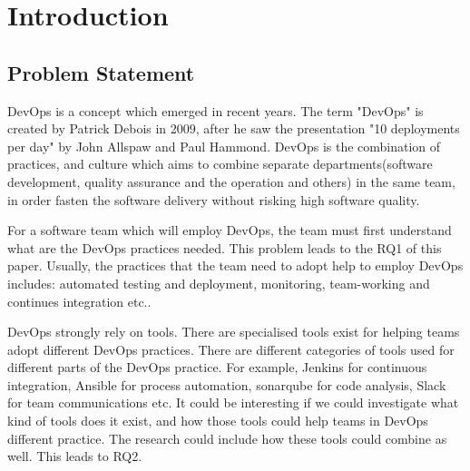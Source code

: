 \chapter{Introduction}
\label{chp:introduction}
\section{Problem Statement}
DevOps is a concept which emerged in recent years. The term "DevOps" is created by Patrick Debois in 2009, after he saw the presentation "10 deployments per day" by John Allspaw and Paul Hammond.\cite{kim2016devops} DevOps is the combination of practices, and culture which aims to combine separate departments(software development, quality assurance and the operation and others) in the same team, in order fasten the software delivery without risking high software quality.\cite{DevOpsWi87:online}\cite{ebert2016devops}
\par
For a software team which will employ DevOps, the team must first understand what are the DevOps practices needed. This problem leads to the RQ1 of this paper.
Usually, the practices that the team need to adopt help to employ DevOps includes: automated testing and deployment, monitoring, team-working and continues integration etc.\cite{jabbari2016devops}\cite{zhu2016devops}.
\par
DevOps strongly rely on tools. There are specialised tools exist for helping teams adopt different DevOps practices\cite{zhu2016devops}. There are different categories of tools used for different parts of the DevOps practice. For example, Jenkins for continuous integration, Ansible for process automation, sonarqube for code analysis, Slack for team communications etc. It could be interesting if we could investigate what kind of tools does it exist, and how those tools could help teams in DevOps different practice. The research could include how these tools could combine as well. This leads to RQ2.
\par
